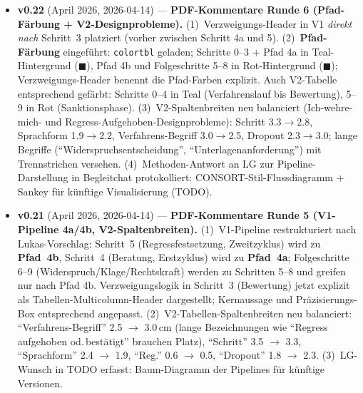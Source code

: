 \documentclass{umbruch-position}
\begin{document}
{\small\sloppy
\begin{itemize}[leftmargin=3em, itemsep=0.5em]
  \item \textbf{v0.22} (April 2026, 2026-04-14) --- \textbf{PDF-Kommentare Runde 6 (Pfad-Färbung + V2-Designprobleme).} (1)~Verzweigungs-Header in V1 \emph{direkt nach} Schritt~3 platziert (vorher zwischen Schritt 4a und 5). (2)~\textbf{Pfad-Färbung} eingeführt: \texttt{colortbl} geladen; Schritte 0--3 + Pfad 4a in Teal-Hintergrund (\textcolor{umbruch-teal}{$\blacksquare$}), Pfad 4b und Folgeschritte 5--8 in Rot-Hintergrund (\textcolor{umbruch-red}{$\blacksquare$}); Verzweigungs-Header benennt die Pfad-Farben explizit. Auch V2-Tabelle entsprechend gefärbt: Schritte 0--4 in Teal (Verfahrenslauf bis Bewertung), 5--9 in Rot (Sanktionsphase). (3)~V2-Spaltenbreiten neu balanciert (Ich-wehre-mich- und Regress-Aufgehoben-Designprobleme): Schritt 3.3$\to$2.8, Sprachform 1.9$\to$2.2, Verfahrens-Begriff 3.0$\to$2.5, Dropout 2.3$\to$3.0; lange Begriffe (``Widerspruchsentscheidung'', ``Unterlagenanforderung'') mit Trennstrichen versehen. (4)~Methoden-Antwort an LG zur Pipeline-Darstellung in Begleitchat protokolliert: CONSORT-Stil-Flussdiagramm + Sankey für künftige Visualisierung (TODO).

  \item \textbf{v0.21} (April 2026, 2026-04-14) --- \textbf{PDF-Kommentare Runde 5 (V1-Pipeline 4a/4b, V2-Spaltenbreiten).} (1)~V1-Pipeline restrukturiert nach Lukas-Vorschlag: Schritt~5 (Regressfestsetzung, Zweitzyklus) wird zu \textbf{Pfad~4b}, Schritt~4 (Beratung, Erstzyklus) wird zu \textbf{Pfad~4a}; Folgeschritte 6--9 (Widerspruch/Klage/Rechtskraft) werden zu Schritten 5--8 und greifen nur nach Pfad 4b. Verzweigungslogik in Schritt~3 (Bewertung) jetzt explizit als Tabellen-Multicolumn-Header dargestellt; Kernaussage und Präzisierungs-Box entsprechend angepasst. (2)~V2-Tabellen-Spaltenbreiten neu balanciert: ``Verfahrens-Begriff'' 2.5 $\to$ 3.0\,cm (lange Bezeichnungen wie ``Regress aufgehoben od.\,bestätigt'' brauchen Platz), ``Schritt'' 3.5 $\to$ 3.3, ``Sprachform'' 2.4 $\to$ 1.9, ``Reg.'' 0.6 $\to$ 0.5, ``Dropout'' 1.8 $\to$ 2.3. (3)~LG-Wunsch in TODO erfasst: Baum-Diagramm der Pipelines für künftige Versionen.


\end{itemize}}
\end{document}
